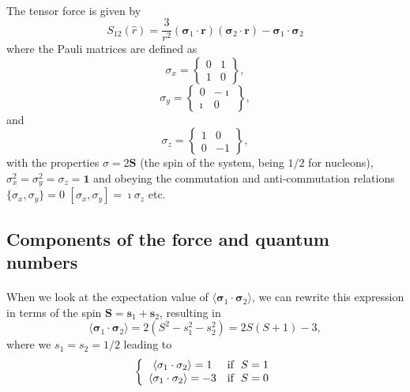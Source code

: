 \documentclass[%
twoside,                 %
final,                   %
10pt]{article}
\begin{document}
\paragraph{}
The tensor force is given by
\[
S_{12} (\hat r) = \frac{3}{r^2}\left(\mathbf{\sigma}_1\cdot \mathbf{r}\right) \left(\mathbf{\sigma}_2\cdot \mathbf{r}\right) -\mathbf{\sigma}_1\cdot\mathbf{\sigma}_2\]
where the Pauli matrices are defined as
\[
\sigma_x =\begin{Bmatrix} 0 & 1 \\ 1 & 0 \end{Bmatrix},
\]
\[
\sigma_y =\begin{Bmatrix} 0 & -\imath \\ \imath & 0 \end{Bmatrix},
\]
and
\[
\sigma_z =\begin{Bmatrix} 1 & 0 \\ 0 & -1 \end{Bmatrix},
\]
with the properties $\sigma = 2\mathbf{S}$ (the spin of the system, being $1/2$ for nucleons), 
$\sigma^2_x=\sigma^2_y=\sigma_z=\mathbf{1}$ and
obeying the commutation and anti-commutation relations $\{\sigma_x,\sigma_y\} =0$
$[\sigma_x,\sigma_y] =\imath\sigma_z$ etc.



\subsection*{Components of the force and quantum numbers}

\paragraph{}
When we look at the expectation value of 
$\langle \mathbf{\sigma}_1\cdot\mathbf{\sigma}_2\rangle$, we can rewrite this expression in terms of the
spin $\mathbf{S}=\mathbf{s}_1+\mathbf{s}_2$, resulting in 
\[
\langle\mathbf{\sigma}_1\cdot\mathbf{\sigma}_2\rangle=2(S^2-s_1^2-s_2^2)=2S(S+1)-3,
\]
where we $s_1=s_2=1/2$ leading to
\[
\left\{ \begin{array}{cc} \langle\mathbf{\sigma}_1\cdot\mathbf{\sigma}_2\rangle=1 &  \mathrm{if} \hspace{0.2cm} S=1\\
\langle\mathbf{\sigma}_1\cdot\mathbf{\sigma}_2\rangle=-3 & \mathrm{if} \hspace{0.2cm} S=0\\\end{array}\right.
\]
\end{document}
